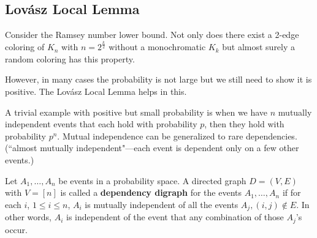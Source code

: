 
\subsection{Lov\'asz Local Lemma}

Consider the Ramsey number lower bound. Not only does there exist a 2-edge coloring of $K_n$ with $n=2^{\frac k2}$ without a monochromatic $K_k$ but almost surely a random coloring has this property.

However, in many cases the probability is not large but we still need to show it is positive. The Lov\'asz Local Lemma helps in this.

A trivial example with positive but small probability is when we have $n$ mutually independent events that each hold with probability $p$, then they hold with probability $p^n$. Mutual independence can be generalized to rare dependencies. (``almost mutually independent"---each event is dependent only on a few other events.)

\begin{df}
Let $A_1,\ldots, A_n$ be %
events in a probability space. %
A directed graph $D=(V,E)$ with $V=[n]$ is called a \textbf{dependency digraph} for the events $A_1,\ldots, A_n$ if for each $i$, $1\leq i\leq n$, $A_i$ is mutually independent of all the events $A_j, (i,j)\nin E$. In other words, $A_i$ is independent of the event that any combination of those $A_j$'s occur.
\end{df}

